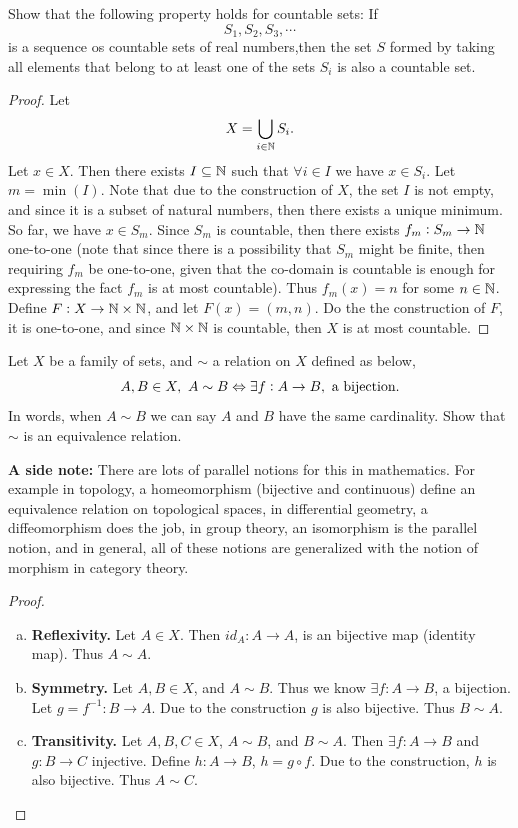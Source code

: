 \begin{problem}
	\label{prob:unionOfCountableManyisCountable}
	Show that the following property holds for countable sets: If
	\[ S_1, S_2, S_3, \cdots \]
	is a sequence os countable sets of real numbers,then the set $S$ formed by taking all elements that belong to at least one of the sets $S_i$ is also a countable set. 
\end{problem}

\begin{proof}
	Let
	\[ X = \bigcup_{i \in \mathbb{N}} S_i. \]
	Let $x \in X$. Then there exists $I \subseteq \mathbb{N}$ such that $\forall i \in I$ we have $x \in S_i$. Let $m = \min(I)$. Note that due to the construction of $X$, the set $I$ is not empty, and since it is a subset of natural numbers, then there exists a unique minimum. So far, we have $x \in S_m$. Since $S_m$ is countable, then there exists $f_m: S_m \to \mathbb{N}$ one-to-one (note that since there is a possibility that $S_m$ might be finite, then requiring $f_m$ be one-to-one, given that the co-domain is countable is enough for expressing the fact $f_m$ is at most countable). Thus $f_m(x)=n$ for some $n \in \mathbb{N}$. Define $F: X \to \mathbb{N} \times \mathbb{N}$, and let $F(x) = (m,n)$. Do the the construction of $F$, it is one-to-one, and since $\mathbb{N} \times \mathbb{N}$ is countable, then $X$ is at most countable. 
\end{proof}


\begin{problem}
	Let $X$ be a family of sets, and $\sim$ a relation on $X$ defined as below,
	\[ A, B \in X,\ A\sim B \Leftrightarrow \exists f: A \to B,\ \text{a bijection}. \]
	In words, when $A \sim B$ we can say $A$ and $B$ have the same cardinality. Show that $\sim$ is an equivalence relation. 
	
	\textbf{A side note:} There are lots of parallel notions for this in mathematics. For example in topology, a homeomorphism (bijective and continuous) define an equivalence relation on topological spaces, in differential geometry, a diffeomorphism does the job, in group theory, an isomorphism is the parallel notion, and in general, all of these notions are generalized with the notion of morphism in category theory.
\end{problem}

\begin{proof}
	~\vspace{2pt}
	\begin{enumerate}[(a)]
		\item \textbf{Reflexivity.} Let $A \in X$. Then $id_A: A \to A$, is an bijective map (identity map). Thus $A \sim A$.
		\item \textbf{Symmetry.} Let $A, B \in X$, and $A \sim B$. Thus we know $\exists f: A \to B$, a bijection. Let $g = f^{-1}: B \to  A$. Due to the construction $g$ is also bijective. Thus $B \sim A$.
		\item \textbf{Transitivity.} Let $A, B, C \in X$, $A \sim B$, and $B \sim A$. Then $\exists f: A\to B$ and $g: B \to C$ injective. Define $h: A \to B$, $h = g \circ f$. Due to the construction, $h$ is also bijective. Thus $A \sim C$.
	\end{enumerate}
\end{proof}


